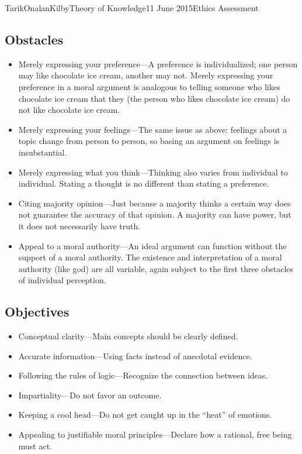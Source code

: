 \documentclass[a4paper,12pt]{article}
\begin{document}
\begin{mla}{Tarik}{Onalan}{Kilby}{Theory of Knowledge}{11 June 2015}{Ethics Assessment}
            \subsection{Obstacles}
                \begin{itemize}
                    \item Merely expressing your preference---A preference is individualized; one person
                        may like chocolate ice cream, another may not. Merely expressing your preference
                        in a moral argument is analogous to telling someone who likes chocolate ice cream
                        that they (the person who likes chocolate ice cream) do not like chocolate ice
                        cream.
                    \item Merely expressing your feelings---The same issue as above: feelings about a
                        topic change from person to person, so basing an argument on feelings is insubstantial.
                    \item Merely expressing what you think---Thinking also varies from individual to
                        individual. Stating a thought is no different than stating a preference.
                    \item Citing majority opinion---Just because a majority thinks a certain way does
                        not guarantee the accuracy of that opinion. A majority can have power, but
                        it does not necessarily have truth.
                    \item Appeal to a moral authority---An ideal argument can function without the support
                        of a moral authority. The existence and interpretation of a moral authority (like
                        god) are all variable, again subject to the first three obstacles of individual
                        perception.
                \end{itemize}
            \subsection{Objectives}
                \begin{itemize}
                    \item Conceptual clarity---Main concepts should be clearly defined. 
                    \item Accurate information---Using facts instead of anecdotal evidence.
                    \item Following the rules of logic---Recognize the connection between ideas.
                    \item Impartiality---Do not favor an outcome.
                    \item Keeping a cool head---Do not get caught up in the ``heat'' of emotions.
                    \item Appealing to justifiable moral principles---Declare how a rational, free being
                        must act.
                \end{itemize}

\end{mla}
\end{document}

